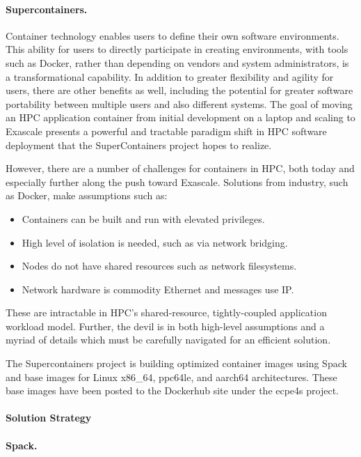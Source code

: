 \paragraph{Supercontainers.}
Container technology enables users to define their own software environments. This ability for users to directly participate in creating environments, with tools such as Docker, rather than depending on vendors and system administrators, is a transformational capability.
In addition to greater flexibility and agility for users, there are other benefits as well, including the potential for greater software portability between multiple users and also different systems. The goal of moving an HPC application container from initial development on a laptop and scaling to Exascale presents a powerful and tractable paradigm shift in HPC software deployment that the SuperContainers project hopes to realize.

However, there are a number of challenges for containers in HPC, both today and especially further along the push toward Exascale. Solutions from industry, such as Docker, make assumptions such as:

\begin{itemize}
	\item	Containers can be built and run with elevated privileges.
	\item	High level of isolation is needed, such as via network bridging.
	\item	Nodes do not have shared resources such as network filesystems.
	\item	Network hardware is commodity Ethernet and messages use IP.
\end{itemize}

These are intractable in HPC’s shared-resource, tightly-coupled application workload model. Further, the devil is in both high-level assumptions and a myriad of details which must be carefully navigated for an efficient solution.

The Supercontainers project is building optimized container images using Spack and base images for Linux x86\_64, ppc64le, and aarch64 architectures. These base images have been posted to the Dockerhub site under the ecpe4s project. 

\paragraph{Solution Strategy}


\paragraph{Spack.}

